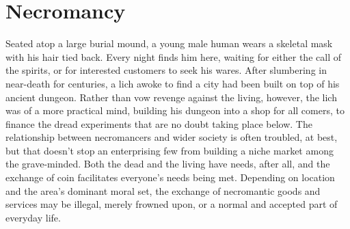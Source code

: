 \documentclass[10pt,a4paper,twoside,twocolumn,openany,nodeprecatedcode,bg=print]{dndbook}
\begin{document}
\section{Necromancy}
Seated atop a large burial mound, a young male human wears a skeletal mask with his hair tied back. Every night finds him here, waiting for either the call of the spirits, or for interested customers to seek his wares.
After slumbering in near-death for centuries, a lich awoke to find a city had been built on top of his ancient dungeon. Rather than vow revenge against the living, however, the lich was of a more practical mind, building his dungeon into a shop for all comers, to finance the dread experiments that are no doubt taking place below.
The relationship between necromancers and wider society is often troubled, at best, but that doesn't stop an enterprising few from building a niche market among the grave-minded. Both the dead and the living have needs, after all, and the exchange of coin facilitates everyone's needs being met. Depending on location and the area's dominant moral set, the exchange of necromantic goods and services may be illegal, merely frowned upon, or a normal and accepted part of everyday life.
\end{document}
